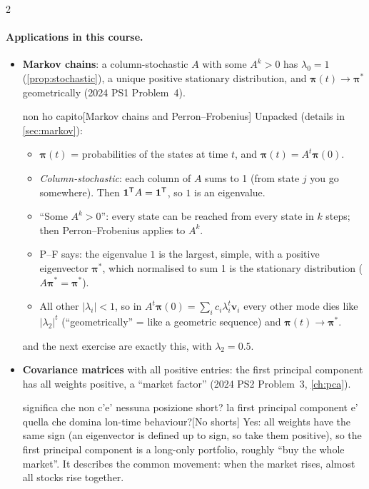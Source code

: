 \begin{paracol}{2}
\paragraph{Applications in this course.}
\begin{itemize}
  \item \textbf{Markov chains}: a column-stochastic $A$ with some $A^k>0$ has $\lambda_0=1$ (\cref{prop:stochastic}),
        a unique positive stationary distribution, and $\bm\pi(t)\to\bm\pi^*$ geometrically (2024 PS1 Problem~4).\begin{answer}{non ho capito}[Markov chains and Perron--Frobenius]
Unpacked (details in \cref{sec:markov}):
\begin{itemize}
  \item $\bm\pi(t)$ = probabilities of the states at time $t$, and $\bm\pi(t)=A^t\bm\pi(0)$.
  \item \emph{Column-stochastic}: each column of $A$ sums to 1 (from state $j$ you go somewhere). Then
        $\bm 1^{\mathsf T} A=\bm 1^{\mathsf T}$, so $1$ is an eigenvalue.
  \item ``Some $A^k>0$'': every state can be reached from every state in $k$ steps; then Perron--Frobenius
        applies to $A^k$.
  \item P--F says: the eigenvalue $1$ is the largest, simple, with a positive eigenvector $\bm\pi^*$, which
        normalised to sum 1 is the stationary distribution ($A\bm\pi^*=\bm\pi^*$).
  \item All other $|\lambda_i|<1$, so in $A^t\bm\pi(0)=\sum_ic_i\lambda_i^t\bm v_i$ every other mode dies like
        $|\lambda_2|^t$ (``geometrically'' = like a geometric sequence) and $\bm\pi(t)\to\bm\pi^*$.
\end{itemize}
 and the next exercise are exactly this, with $\lambda_2=0.5$.
\end{answer}
  \item \textbf{Covariance matrices} with all positive entries: the first principal component has all weights
        positive, a ``market factor'' (2024 PS2 Problem~3, \cref{ch:pca}).\begin{answer}{significa che non c'e' nessuna posizione short? la first principal component e' quella che domina lon-time behaviour?}[No shorts]
Yes: all weights have the same sign (an eigenvector is defined up to sign, so take them positive), so
the first principal component is a long-only portfolio, roughly ``buy the whole market''. It describes the
common movement: when the market rises, almost all stocks rise together.

\end{answer}
\end{itemize}
\end{paracol}
